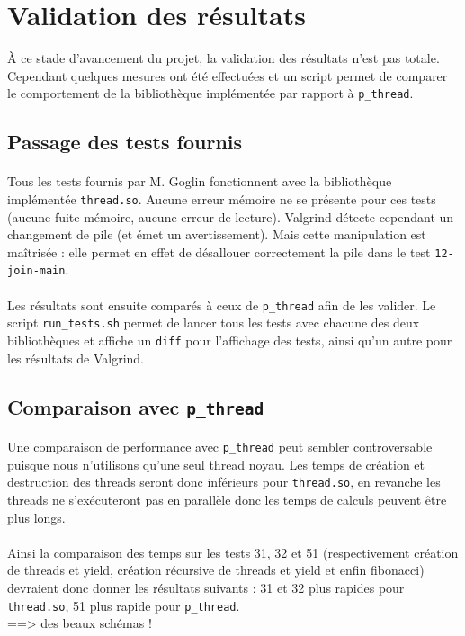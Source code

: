 \section{Validation des résultats}

\`A ce stade d'avancement du projet, la validation des résultats n'est pas totale. Cependant quelques mesures ont été effectuées et un script permet de comparer le comportement de la bibliothèque implémentée par rapport à \texttt{p\_thread}.

\subsection{Passage des tests fournis}

\paragraph{}
Tous les tests fournis par M. Goglin fonctionnent avec la bibliothèque implémentée \texttt{thread.so}. Aucune erreur mémoire ne se présente pour ces tests (aucune fuite mémoire, aucune erreur de lecture). \textsf{Valgrind} détecte cependant un changement de pile (et émet un avertissement). Mais cette manipulation est maîtrisée : elle permet en effet de désallouer correctement la pile dans le test \texttt{12-join-main}.

\paragraph{}
Les résultats sont ensuite comparés à ceux de \texttt{p\_thread} afin de les valider. Le script \texttt{run\_tests.sh} permet de lancer tous les tests avec chacune des deux bibliothèques et affiche un \texttt{diff} pour l'affichage des tests, ainsi qu'un autre pour les résultats de \textsf{Valgrind}.

\subsection{Comparaison avec \texttt{p\_thread}}

\paragraph{}
Une comparaison de performance avec \texttt{p\_thread} peut sembler controversable puisque nous n'utilisons qu'une seul thread noyau. Les temps de création et destruction des threads seront donc inférieurs pour \texttt{thread.so}, en revanche les threads ne s'exécuteront pas en parallèle donc les temps de calculs peuvent être plus longs.

\paragraph{}
Ainsi la comparaison des temps sur les tests 31, 32 et 51 (respectivement création de threads et yield, création récursive de threads et yield et enfin fibonacci) devraient donc donner les résultats suivants : 31 et 32 plus rapides pour \texttt{thread.so}, 51 plus rapide pour \texttt{p\_thread}.
\\
==> des beaux schémas !
 
